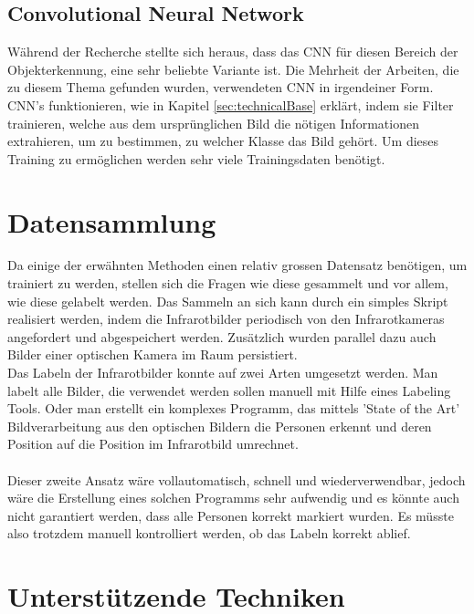 \subsection{Convolutional Neural Network}

Während der Recherche stellte sich heraus, dass das \gls{CNN} für diesen Bereich der Objekterkennung, eine sehr beliebte Variante ist. Die Mehrheit der Arbeiten, die zu diesem Thema gefunden wurden, verwendeten \gls{CNN} in irgendeiner Form.\\
\gls{CNN}'s funktionieren, wie in Kapitel \ref{sec:technicalBase} erklärt, indem sie Filter trainieren, welche aus dem ursprünglichen Bild die nötigen Informationen extrahieren, um zu bestimmen, zu welcher Klasse das Bild gehört. Um dieses Training zu ermöglichen werden sehr viele Trainingsdaten benötigt.


\section{Datensammlung}

Da einige der erwähnten Methoden einen relativ grossen Datensatz benötigen, um trainiert zu werden, stellen sich die Fragen wie diese gesammelt und vor allem, wie diese gelabelt werden. Das Sammeln an sich kann durch ein simples Skript realisiert werden, indem die Infrarotbilder periodisch von den Infrarotkameras angefordert und abgespeichert werden. Zusätzlich wurden parallel dazu auch Bilder einer optischen Kamera im Raum persistiert.\\
Das Labeln der Infrarotbilder konnte auf zwei Arten umgesetzt werden. Man labelt alle Bilder, die verwendet werden sollen manuell mit Hilfe eines Labeling Tools. Oder man erstellt ein komplexes Programm, das mittels 'State of the Art' Bildverarbeitung aus den optischen Bildern die Personen erkennt und deren Position auf die Position im Infrarotbild umrechnet.\\
\\
Dieser zweite Ansatz wäre vollautomatisch, schnell und wiederverwendbar, jedoch wäre die Erstellung eines solchen Programms sehr aufwendig und es könnte auch nicht garantiert werden, dass alle Personen korrekt markiert wurden. Es müsste also trotzdem manuell kontrolliert werden, ob das Labeln korrekt ablief. 


\section{Unterstützende Techniken}

